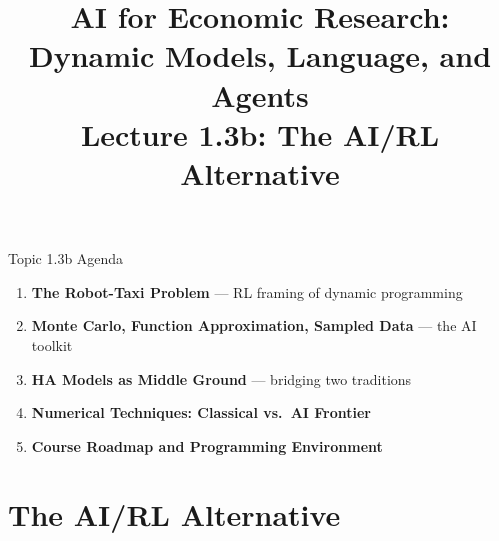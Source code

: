 


\graphicspath{{./pic/}{../../FullCourse_10Lecs/Lec01_Quant_Macro/pic/}{../}}

\title[AI for Econ Research]{AI for Economic Research: Dynamic Models, Language, and Agents\\
Lecture 1.3b: The AI/RL Alternative}



\makebeamertitle

\begin{frame}{Topic 1.3b Agenda}
\begin{enumerate}
  \item \textbf{The Robot-Taxi Problem} --- RL framing of dynamic programming
  \medskip
  \item \textbf{Monte Carlo, Function Approximation, Sampled Data} --- the AI toolkit
  \medskip
  \item \textbf{HA Models as Middle Ground} --- bridging two traditions
  \medskip
  \item \textbf{Numerical Techniques: Classical vs.\ AI Frontier}
  \medskip
  \item \textbf{Course Roadmap and Programming Environment}
\end{enumerate}
\end{frame}

\section{The AI/RL Alternative}

